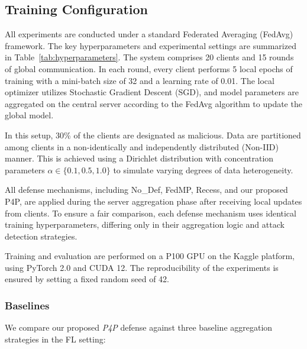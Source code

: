 \subsection{Training Configuration}

All experiments are conducted under a standard Federated Averaging (FedAvg) framework. The key hyperparameters and experimental settings are summarized in Table~\ref{tab:hyperparameters}. The system comprises 20 clients and 15 rounds of global communication. In each round, every client performs 5 local epochs of training with a mini-batch size of 32 and a learning rate of 0.01. The local optimizer utilizes Stochastic Gradient Descent (SGD), and model parameters are aggregated on the central server according to the FedAvg algorithm to update the global model.

In this setup, 30\% of the clients are designated as malicious. Data are partitioned among clients in a non-identically and independently distributed (Non-IID) manner. This is achieved using a Dirichlet distribution with concentration parameters $\alpha \in \{0.1, 0.5, 1.0\}$ to simulate varying degrees of data heterogeneity.

All defense mechanisms, including No\_Def, FedMP, Recess, and our proposed P4P, are applied during the server aggregation phase after receiving local updates from clients. To ensure a fair comparison, each defense mechanism uses identical training hyperparameters, differing only in their aggregation logic and attack detection strategies.

Training and evaluation are performed on a P100 GPU on the Kaggle platform, using PyTorch 2.0 and CUDA 12. The reproducibility of the experiments is ensured by setting a fixed random seed of 42.

\subsubsection{Baselines}

We compare our proposed \textit{P4P} defense against three baseline aggregation strategies in the FL setting:

